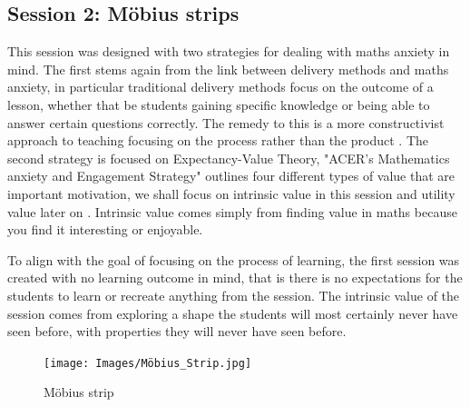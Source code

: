 \documentclass[11pt, a4paper, notitlepage]{article}
\begin{document}
\subsection{Session 2: M\"obius strips}
This session was designed with two strategies for dealing with maths anxiety in mind. The first stems again from the link between delivery methods and maths anxiety, in particular traditional delivery methods focus on the outcome of a lesson, whether that be students gaining specific knowledge or being able to answer certain questions correctly. The remedy to this is a more constructivist approach to teaching focusing on the process rather than the product \cite{Finlayson:2014}. The second strategy is focused on Expectancy-Value Theory, "ACER's Mathematics anxiety and Engagement Strategy" outlines four different types of value that are important motivation, we shall focus on intrinsic value in this session and utility value later on \cite{MAES:2024} . Intrinsic value comes simply from finding value in maths because you find it interesting or enjoyable.

\par

To align with the goal of focusing on the process of learning, the first session was created with no learning outcome in mind, that is there is no expectations for the students to learn or recreate anything from the session. The intrinsic value of the session comes from exploring a shape the students will most certainly never have seen before, with properties they will never have seen before. 

\begin{figure}[h]
\centering
\texttt{[image: Images/Möbius\_Strip.jpg]}
\caption{M\"obius strip}
\end{figure}
\end{document}
